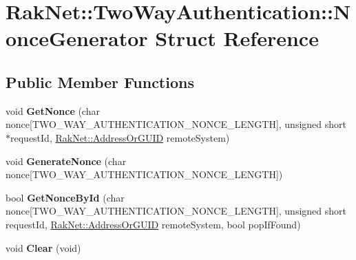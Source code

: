 \hypertarget{struct_rak_net_1_1_two_way_authentication_1_1_nonce_generator}{\section{Rak\-Net\-:\-:Two\-Way\-Authentication\-:\-:Nonce\-Generator Struct Reference}
\label{struct_rak_net_1_1_two_way_authentication_1_1_nonce_generator}
}
\subsection*{Public Member Functions}
\begin{DoxyCompactItemize}
\item 
\hypertarget{struct_rak_net_1_1_two_way_authentication_1_1_nonce_generator_aefe7f907047570f7dfb253f45314d135}{void {\bfseries Get\-Nonce} (char nonce\mbox{[}T\-W\-O\-\_\-\-W\-A\-Y\-\_\-\-A\-U\-T\-H\-E\-N\-T\-I\-C\-A\-T\-I\-O\-N\-\_\-\-N\-O\-N\-C\-E\-\_\-\-L\-E\-N\-G\-T\-H\mbox{]}, unsigned short $\ast$request\-Id, \hyperlink{struct_rak_net_1_1_address_or_g_u_i_d}{Rak\-Net\-::\-Address\-Or\-G\-U\-I\-D} remote\-System)}\label{struct_rak_net_1_1_two_way_authentication_1_1_nonce_generator_aefe7f907047570f7dfb253f45314d135}

\item 
\hypertarget{struct_rak_net_1_1_two_way_authentication_1_1_nonce_generator_a8d678cf66e98d0441c2c912cd38bda0f}{void {\bfseries Generate\-Nonce} (char nonce\mbox{[}T\-W\-O\-\_\-\-W\-A\-Y\-\_\-\-A\-U\-T\-H\-E\-N\-T\-I\-C\-A\-T\-I\-O\-N\-\_\-\-N\-O\-N\-C\-E\-\_\-\-L\-E\-N\-G\-T\-H\mbox{]})}\label{struct_rak_net_1_1_two_way_authentication_1_1_nonce_generator_a8d678cf66e98d0441c2c912cd38bda0f}

\item 
\hypertarget{struct_rak_net_1_1_two_way_authentication_1_1_nonce_generator_a469b97ae9e9c756fdd89e2303779633e}{bool {\bfseries Get\-Nonce\-By\-Id} (char nonce\mbox{[}T\-W\-O\-\_\-\-W\-A\-Y\-\_\-\-A\-U\-T\-H\-E\-N\-T\-I\-C\-A\-T\-I\-O\-N\-\_\-\-N\-O\-N\-C\-E\-\_\-\-L\-E\-N\-G\-T\-H\mbox{]}, unsigned short request\-Id, \hyperlink{struct_rak_net_1_1_address_or_g_u_i_d}{Rak\-Net\-::\-Address\-Or\-G\-U\-I\-D} remote\-System, bool pop\-If\-Found)}\label{struct_rak_net_1_1_two_way_authentication_1_1_nonce_generator_a469b97ae9e9c756fdd89e2303779633e}

\item 
\hypertarget{struct_rak_net_1_1_two_way_authentication_1_1_nonce_generator_a5f03c52a063d2355b31676318a9221ca}{void {\bfseries Clear} (void)}\label{struct_rak_net_1_1_two_way_authentication_1_1_nonce_generator_a5f03c52a063d2355b31676318a9221ca}


\end{DoxyCompactItemize}
